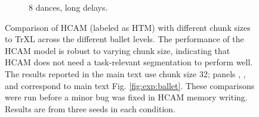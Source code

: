 \begin{figure}[htb]
\begin{subfigure}{0.33\textwidth}
    \caption{8 dances, long delays.}
    \label{fig:supp_exp:ballet:8long}
    \end{subfigure}
    \caption{Comparison of HCAM (labeled as HTM) with different chunk sizes to TrXL across the different ballet levels. The performance of the HCAM model is robust to varying chunk size, indicating that HCAM does not need a task-relevant segmentation to perform well. The results reported in the main text use chunk size 32; panels , , and  correspond to main text Fig. \ref{fig:exp:ballet}. These comparisons were run before a minor bug was fixed in HCAM memory writing. Results are from three seeds in each condition.}
    \label{fig:supp_exp:ballet}
\end{figure}

